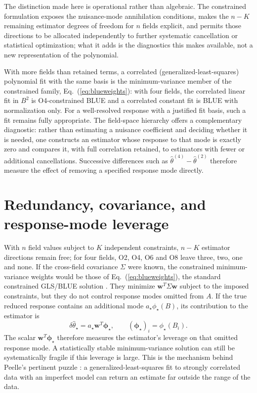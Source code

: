 \documentclass[aps,prd,reprint,twocolumn,superscriptaddress,nofootinbib,longbibliography]{revtex4-2}
\begin{document}
The distinction made here is operational rather than algebraic. The constrained formulation exposes the nuisance-mode annihilation conditions, makes the $n-K$ remaining estimator degrees of freedom for $n$ fields explicit, and permits those directions to be allocated independently to further systematic cancellation or statistical optimization; what it adds is the diagnostics this makes available, not a new representation of the polynomial.

With more fields than retained terms, a correlated (generalized-least-squares) polynomial fit with the same basis is the minimum-variance member of the constrained family, Eq.~(\ref{eq:blueweights}): with four fields, the correlated linear fit in $B^2$ is O4-constrained BLUE and a correlated constant fit is BLUE with normalization only. For a well-resolved response with a justified fit basis, such a fit remains fully appropriate. The field-space hierarchy offers a complementary diagnostic: rather than estimating a nuisance coefficient and deciding whether it is needed, one constructs an estimator whose response to that mode is exactly zero and compares it, with full correlation retained, to estimators with fewer or additional cancellations. Successive differences such as $\widehat\theta^{(4)}-\widehat\theta^{(2)}$ therefore measure the effect of removing a specified response mode directly.

\section{Redundancy, covariance, and response-mode leverage}
\label{sec:leverage}

With $n$ field values subject to $K$ independent constraints, $n-K$ estimator directions remain free; for four fields, O2, O4, O6 and O8 leave three, two, one and none.
If the cross-field covariance $\Sigma$ were known, the constrained minimum-variance weights would be those of Eq.~(\ref{eq:blueweights}), the standard constrained GLS/BLUE solution \cite{ValassiChierici2014}. They minimize $\bm w^T\Sigma\bm w$ subject to the imposed constraints, but they do not control response modes omitted from $A$. If the true reduced response contains an additional mode $a_\star\phi_\star(B)$, its contribution to the estimator is
\begin{equation}
\delta\widehat\theta_\star
=a_\star\bm w^T\bm\phi_\star,
\qquad
(\bm\phi_\star)_i=\phi_\star(B_i).
\label{eq:leverage}
\end{equation}
The scalar $\bm w^T\bm\phi_\star$ therefore measures the estimator's leverage on that omitted response mode. A statistically stable minimum-variance solution can still be systematically fragile if this leverage is large. This is the mechanism behind Peelle's pertinent puzzle \cite{DAgostini1994}: a generalized-least-squares fit to strongly correlated data with an imperfect model can return an estimate far outside the range of the data.
\end{document}
